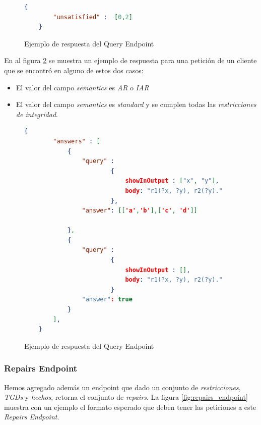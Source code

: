 \documentclass[11pt,a4paper,twoside]{tesis}
\begin{document}
\begin{figure}[ht]
    \begin{lstlisting}[language=json,firstnumber=1]
    {
    	"unsatisfied" :  [0,2]
    }
    \end{lstlisting}
    \caption{Ejemplo de respuesta del Query Endpoint}
    \label{fig:query_endpoint_answer_2}
\end{figure}


En al figura \ref{fig:query_endpoint_answer_1} se muestra un ejemplo de respuesta para una petición de un cliente que se encontró en alguno de estos dos casos:

\begin{itemize}
    \item El valor del campo \textit{semantics} es \textit{AR} o \textit{IAR}
    \item El valor del campo \textit{semantics} es \textit{standard} y se cumplen todas las \textit{restricciones de integridad}.
\end{itemize}

\begin{figure}[ht]
    \begin{lstlisting}[language=json,firstnumber=1]
    {
    	"answers" : [
            {
                "query" : 
                        {
                            showInOutput : ["x", "y"],
                            body: "r1(?x, ?y), r2(?y)."
                        },
                "answer": [['a','b'],['c', 'd']]
                        
            },
            {
                "query" : 
                        {
                            showInOutput : [],
                            body: "r1(?x, ?y), r2(?y)."
                        }
                "answer": true
            }
    	],
    }
    \end{lstlisting}
    \caption{Ejemplo de respuesta del Query Endpoint}
    \label{fig:query_endpoint_answer_1}
\end{figure}

\subsubsection{Repairs Endpoint}

Hemos agregado además un endpoint que dado un conjunto de \textit{restricciones}, \textit{TGDs} y \textit{hechos}, retorna el conjunto de \textit{repairs}. La figura \ref{fig:repairs_endpoint} muestra con un ejemplo el formato esperado que deben tener las peticiones a este \textit{Repairs Endpoint}.
\end{document}
